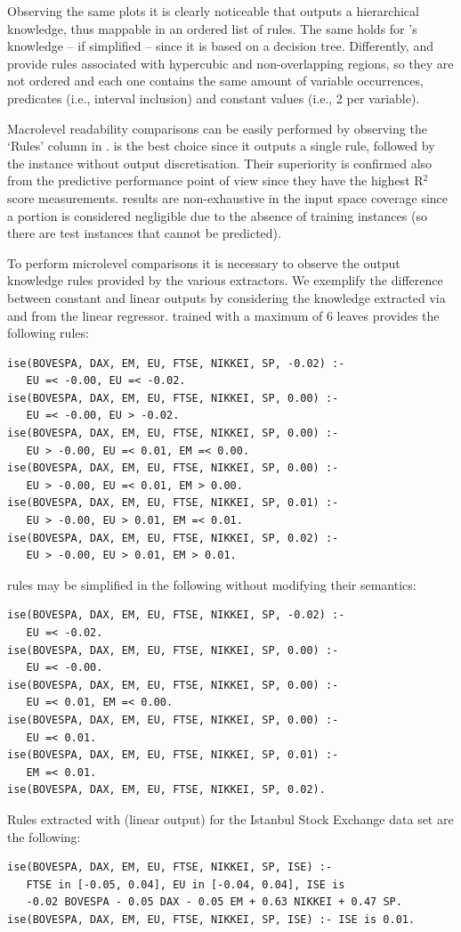 \documentclass[sigconf]{acmart}
\begin{document}
Observing the same plots it is clearly noticeable that \creepy{} outputs a hierarchical knowledge, thus mappable in an ordered list of rules.
%
The same holds for \cart{}'s knowledge -- if simplified -- since it is based on a decision tree.
%
Differently, \gridex{} and \gridex{} provide rules associated with hypercubic and non-overlapping regions, so they are not ordered and each one contains the same amount of variable occurrences, predicates (i.e., interval inclusion) and constant values (i.e., 2 per variable).

Macrolevel readability comparisons can be easily performed by observing the `Rules' column in .
%
\gridrex{} is the best choice since it outputs a single rule, followed by the \creepy{} instance without output discretisation.
%
Their superiority is confirmed also from the predictive performance point of view since they have the highest R$^2$ score measurements.
%
\gridrex{} results are non-exhaustive in the input space coverage since a portion is considered negligible due to the absence of training instances (so there are test instances that cannot be predicted).

To perform microlevel comparisons it is necessary to observe the output knowledge rules provided by the various extractors.
%
We exemplify the difference between constant and linear outputs by considering the knowledge extracted via \cart{} and \creepy{} from the linear regressor.
%
\cart{} trained with a maximum of 6 leaves provides the following rules:
%
\begin{lstlisting}
ise(BOVESPA, DAX, EM, EU, FTSE, NIKKEI, SP, -0.02) :-
   EU =< -0.00, EU =< -0.02.
ise(BOVESPA, DAX, EM, EU, FTSE, NIKKEI, SP, 0.00) :-
   EU =< -0.00, EU > -0.02.
ise(BOVESPA, DAX, EM, EU, FTSE, NIKKEI, SP, 0.00) :-
   EU > -0.00, EU =< 0.01, EM =< 0.00.
ise(BOVESPA, DAX, EM, EU, FTSE, NIKKEI, SP, 0.00) :-
   EU > -0.00, EU =< 0.01, EM > 0.00.
ise(BOVESPA, DAX, EM, EU, FTSE, NIKKEI, SP, 0.01) :-
   EU > -0.00, EU > 0.01, EM =< 0.01.
ise(BOVESPA, DAX, EM, EU, FTSE, NIKKEI, SP, 0.02) :-
   EU > -0.00, EU > 0.01, EM > 0.01.
\end{lstlisting}
%
\cart{} rules may be simplified in the following without modifying their semantics:
%
\begin{lstlisting}
ise(BOVESPA, DAX, EM, EU, FTSE, NIKKEI, SP, -0.02) :-
   EU =< -0.02.
ise(BOVESPA, DAX, EM, EU, FTSE, NIKKEI, SP, 0.00) :-
   EU =< -0.00.
ise(BOVESPA, DAX, EM, EU, FTSE, NIKKEI, SP, 0.00) :-
   EU =< 0.01, EM =< 0.00.
ise(BOVESPA, DAX, EM, EU, FTSE, NIKKEI, SP, 0.00) :-
   EU =< 0.01.
ise(BOVESPA, DAX, EM, EU, FTSE, NIKKEI, SP, 0.01) :-
   EM =< 0.01.
ise(BOVESPA, DAX, EM, EU, FTSE, NIKKEI, SP, 0.02).
\end{lstlisting}
%
Rules extracted with \creepy{} (linear output) for the Istanbul Stock Exchange data set are the following:
%
\begin{lstlisting}
ise(BOVESPA, DAX, EM, EU, FTSE, NIKKEI, SP, ISE) :-
   FTSE in [-0.05, 0.04], EU in [-0.04, 0.04], ISE is 
   -0.02 BOVESPA - 0.05 DAX - 0.05 EM + 0.63 NIKKEI + 0.47 SP.
ise(BOVESPA, DAX, EM, EU, FTSE, NIKKEI, SP, ISE) :- ISE is 0.01.
\end{lstlisting}
\end{document}
